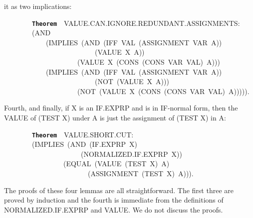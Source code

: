\documentclass[11pt]{book}
\newenvironment{pubasis}{\begin{flushleft}\ttfamily\small}{\normalsize\rmfamily\end{flushleft}}
\newcommand{\axiomordefinition}[1]{\vspace{6pt}\texttt{\textbf{#1}}}
\begin{document}
it as two implications:
\begin{pubasis}
~~~~~~~~\axiomordefinition{Theorem}~~VALUE.CAN.IG\-NORE.RE\-DUN\-DANT.ASSIGN\-MENTS:\\
~~~~~~~~(AND\\
~~~~~~~~~~~~(IMPLIES~(AND~(IFF~VAL~(ASSIGNMENT~VAR~A))\\
~~~~~~~~~~~~~~~~~~~~~~~~~~(VALUE~X~A))\\
~~~~~~~~~~~~~~~~~~~~~(VALUE~X~(CONS~(CONS~VAR~VAL)~A)))\\
~~~~~~~~~~~~(IMPLIES~(AND~(IFF~VAL~(ASSIGNMENT~VAR~A))\\
~~~~~~~~~~~~~~~~~~~~~~~~~~(NOT~(VALUE~X~A)))\\
~~~~~~~~~~~~~~~~~~~~~(NOT~(VALUE~X~(CONS~(CONS~VAR~VAL)~A))))).\\
\end{pubasis}
Fourth, and finally, if X is an IF.EXPRP and is in IF-normal form,
then the VALUE of (TEST X) under A is just the assignment of (TEST X) in
A:
\begin{pubasis}
~~~~~~~~\axiomordefinition{Theorem}~~VALUE.SHORT.CUT:\\
~~~~~~~~(IMPLIES~(AND~(IF.EXPRP~X)\\
~~~~~~~~~~~~~~~~~~~~~~(NOR\-MAL\-IZED.IF.EXPRP~X))\\
~~~~~~~~~~~~~~~~~(EQUAL~(VALUE~(TEST~X)~A)\\
~~~~~~~~~~~~~~~~~~~~~~~~(ASSIGNMENT~(TEST~X)~A))).\\
\end{pubasis}
The proofs of these four lemmas are all straightforward.  The first three
are proved by induction and the fourth is immediate from the definitions
of NOR\-MAL\-IZED.IF.EXPRP and VALUE.  We do not discuss the proofs.
\end{document}
